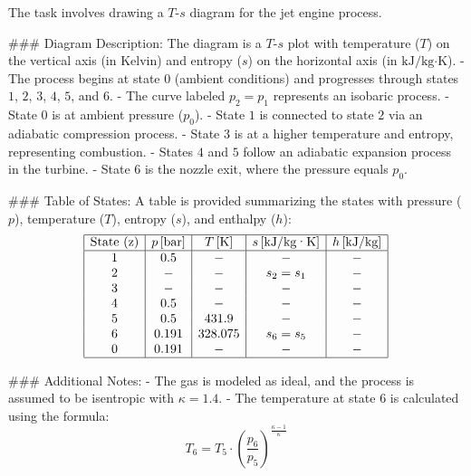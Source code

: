 The task involves drawing a \( T \)-\( s \) diagram for the jet engine process.  

### Diagram Description:  
The diagram is a \( T \)-\( s \) plot with temperature (\( T \)) on the vertical axis (in Kelvin) and entropy (\( s \)) on the horizontal axis (in \( \text{kJ}/\text{kg·K} \)).  
- The process begins at state \( 0 \) (ambient conditions) and progresses through states \( 1 \), \( 2 \), \( 3 \), \( 4 \), \( 5 \), and \( 6 \).  
- The curve labeled \( p_2 = p_1 \) represents an isobaric process.  
- State \( 0 \) is at ambient pressure (\( p_0 \)).  
- State \( 1 \) is connected to state \( 2 \) via an adiabatic compression process.  
- State \( 3 \) is at a higher temperature and entropy, representing combustion.  
- States \( 4 \) and \( 5 \) follow an adiabatic expansion process in the turbine.  
- State \( 6 \) is the nozzle exit, where the pressure equals \( p_0 \).  

### Table of States:  
A table is provided summarizing the states with pressure (\( p \)), temperature (\( T \)), entropy (\( s \)), and enthalpy (\( h \)):  
\[
\begin{array}{|c|c|c|c|c|}
\hline
\text{State (z)} & p \, [\text{bar}] & T \, [\text{K}] & s \, [\text{kJ}/\text{kg·K}] & h \, [\text{kJ}/\text{kg}] \\
\hline
1 & 0.5 & - & - & - \\
2 & - & - & s_2 = s_1 & - \\
3 & - & - & - & - \\
4 & 0.5 & - & - & - \\
5 & 0.5 & 431.9 & - & - \\
6 & 0.191 & 328.075 & s_6 = s_5 & - \\
0 & 0.191 & - & - & - \\
\hline
\end{array}
\]

### Additional Notes:  
- The gas is modeled as ideal, and the process is assumed to be isentropic with \( \kappa = 1.4 \).  
- The temperature at state \( 6 \) is calculated using the formula:  
\[
T_6 = T_5 \cdot \left( \frac{p_6}{p_5} \right)^{\frac{\kappa - 1}{\kappa}}
\]